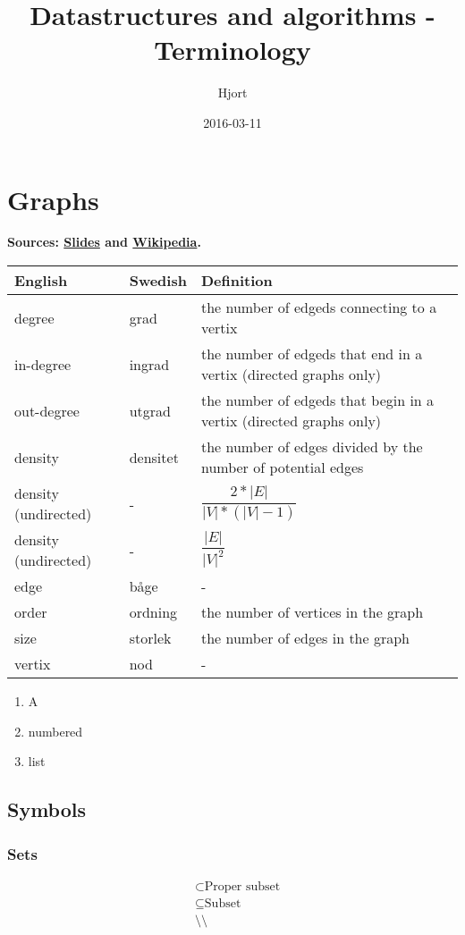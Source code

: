 \documentclass{article}
\title{Datastructures and algorithms - Terminology}
\date{2016-03-11}
\author{Hjort}
\begin{document}
\maketitle

\section{Graphs}

\textbf{Sources: \href{http://www.cse.chalmers.se/edu/course/tda416/mtrl/lectures/F9.pdf}{Slides} and \href{https://en.wikipedia.org/wiki/Glossary_of_graph_theory}{Wikipedia}.}

\begin{tabular}{l || l || p{5cm}}

    English & Swedish & Definition \\ \hline\hline
    degree & grad & the number of edgeds connecting to a vertix \\\hline
    in-degree & ingrad & the number of edgeds that end in a vertix (directed graphs only)\\\hline
    out-degree & utgrad & the number of edgeds that begin in a vertix (directed graphs only)\\\hline
    density & densitet & the number of edges divided by the number of potential edges \\\hline
    density (undirected) & - & $\dfrac{ 2 * \lvert E\rvert }{ \lvert V\rvert * (\lvert V\rvert - 1)}$ \\\hline
    density (undirected) & - & $\dfrac{ \lvert E\rvert }{ \lvert V\rvert ^2}$ \\\hline
    edge & båge & - \\\hline
    order & ordning & the number of vertices in the graph \\\hline
    size & storlek & the number of edges in the graph \\\hline
    vertix & nod & - \\\hline
    
\end{tabular}

\begin{enumerate}
    \item A
    \item numbered
    \item list
\end{enumerate}

\subsection{Symbols}

\subsubsection{Sets}

\begin{align*}
    & \subset \text{Proper subset} \\
    & \subseteq \text{Subset} \\
    & \setminus \text{\textbackslash} \\
\end{align*}

 


\end{document}
